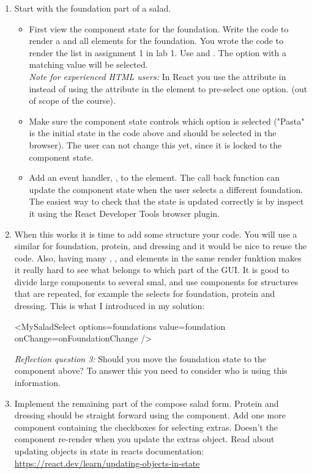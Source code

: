 \documentclass[fleqn, article, a4paper]{memoir}
\begin{document}
\begin{Assignments}
\begin{enumerate}
  \item Start with the foundation part of a salad. 
  \begin{itemize}
    \item First view the component state for the foundation. Write the code to render a  and all  elements for the foundation. You wrote the code to render the  list in assignment 1 in lab 1. Use  and . The option with a matching value will be selected.\\
    \emph{Note for experienced HTML users:} In React you use the  attribute in  instead of using the  attribute in the  element to pre-select one option. (out of scope of the course).
    \item Make sure the component state controls which option is selected ("Pasta" is the initial state in the code above and should be selected in the browser). The user can not change this yet, since it is locked to the component state.
    \item Add an event handler, , to the  element. The call back function can update the component state when the user selects a different foundation. The easiest way to check that the state is updated correctly is by inspect it using the React Developer Tools browser plugin.
  \end{itemize}
  \item When this works it is time to add some structure your code. You will use a similar  for foundation, protein, and dressing and it would be nice to reuse the code. Also, having many , , and  elements in the same render funktion makes it really hard to see what belongs to which part of the GUI. It is good to divide large components to several smal, and use components for structures that are repeated, for example the selects for foundation, protein and dressing. This is what I introduced in my solution:
  \begin{Code}
  <MySaladSelect
      options={foundations}
      value={foundation}
      onChange={onFoundationChange}
  />
  \end{Code}
  \emph{Reflection question 3:} Should you move the foundation state to the  component above? To answer this you need to consider who is using this information.

\item Implement the remaining part of the compose salad form. Protein and dressing should be straight forward using the  component. Add one more component containing the checkboxes for selecting extras. Doesn't the component re-render when you update the extras object. Read about updating objects in state in reacts documentation: \url{https://react.dev/learn/updating-objects-in-state}


\end{enumerate}
\end{Assignments}
\end{document}
